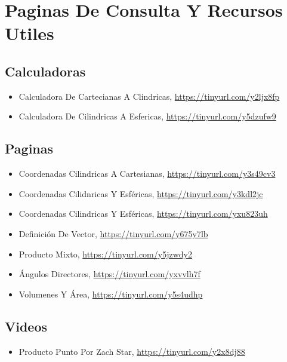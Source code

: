 \documentclass{article}
\begin{document}
\section{Paginas De Consulta Y Recursos Utiles}
\label{sec:org73f1297}
\subsection{Calculadoras}
\label{sec:org4e7059e}
\begin{itemize}
\item Calculadora De Cartecianas A Clindricas, \url{https://tinyurl.com/y2ljx8fp}
\item Calculadora De Cilindricas A Esfericas, \url{https://tinyurl.com/y5dzufw9}
\end{itemize}

\subsection{Paginas}
\label{sec:orgfbdbec7}
\begin{itemize}
\item Coordenadas Cilindricas A Cartesianas, \url{https://tinyurl.com/y3s49cv3}
\item Coordenadas Cilidnricas Y Esféricas, \url{https://tinyurl.com/y3kdl2jc}
\item Coordenadas Cilindricas Y Esféricas, \url{https://tinyurl.com/yxu823uh}
\item Definición De Vector, \url{https://tinyurl.com/y675y7lb}
\item Producto Mixto, \url{https://tinyurl.com/y5jzwdy2}
\item Ángulos Directores, \url{https://tinyurl.com/yxvvlh7f}
\item Volumenes Y Área, \url{https://tinyurl.com/y5s4udhp}
\end{itemize}

\subsection{Videos}
\label{sec:orgaa1b49a}
\begin{itemize}
\item Producto Punto Por Zach Star, \url{https://tinyurl.com/y2x8dj88}
\end{itemize}
\end{document}
